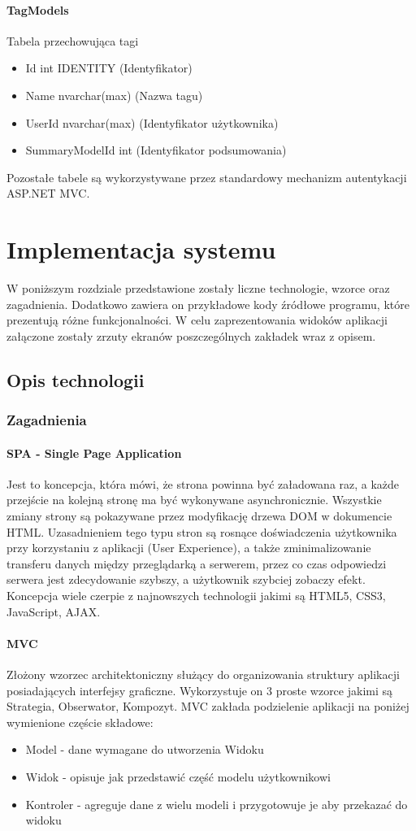 \documentclass[10pt,titlepage]{article}
\begin{document}
\paragraph[short]{TagModels}
Tabela przechowująca tagi
\begin{itemize}
  \item Id int IDENTITY (Identyfikator)
  \item Name nvarchar(max) (Nazwa tagu)
  \item UserId nvarchar(max) (Identyfikator użytkownika)
  \item SummaryModelId int (Identyfikator podsumowania)
\end{itemize}
Pozostałe tabele są wykorzystywane przez standardowy mechanizm autentykacji ASP.NET MVC.
\section{Implementacja systemu}
W poniższym rozdziale przedstawione zostały liczne technologie, wzorce oraz zagadnienia. Dodatkowo zawiera on przykładowe kody źródłowe programu, które prezentują różne funkcjonalności. W celu zaprezentowania widoków aplikacji załączone zostały zrzuty ekranów poszczególnych zakładek wraz z opisem.
\subsection{Opis technologii}
\subsubsection{Zagadnienia}
\paragraph{SPA - Single Page Application}
Jest to koncepcja, która mówi, że strona powinna być załadowana raz, a każde przejście na kolejną stronę ma być wykonywane asynchronicznie. Wszystkie zmiany strony są pokazywane przez modyfikację drzewa DOM w dokumencie HTML. Uzasadnieniem tego typu stron są rosnące doświadczenia użytkownika przy korzystaniu z aplikacji (User Experience), a także zminimalizowanie transferu danych między przeglądarką a serwerem, przez co czas odpowiedzi serwera jest zdecydowanie szybszy, a użytkownik szybciej zobaczy efekt. Koncepcja wiele czerpie z najnowszych technologii jakimi są HTML5, CSS3, JavaScript, AJAX.
\paragraph{MVC}
Złożony wzorzec architektoniczny służący do organizowania struktury aplikacji posiadających interfejsy graficzne. Wykorzystuje on 3 proste wzorce jakimi są Strategia, Obserwator, Kompozyt.\linebreak
MVC zakłada podzielenie aplikacji na poniżej wymienione częście składowe:
\begin{itemize}
  \item Model - dane wymagane do utworzenia Widoku
  \item Widok - opisuje jak przedstawić część modelu użytkownikowi
  \item Kontroler - agreguje dane z wielu modeli i przygotowuje je aby przekazać do widoku
\end{itemize}
\end{document}
